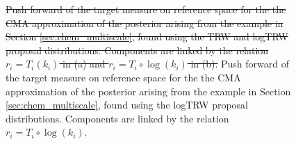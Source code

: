 \documentclass[final]{siamltex}
\newcommand{\edit}[1]{{\color{red} #1}}  %
\providecommand{\DIFdel}[1]{{\protect\color{red}\sout{#1}}}                      %
\providecommand{\DIFdelend}{} %
\providecommand{\DIFdelFL}[1]{\DIFdel{#1}} %
\providecommand{\DIFaddbeginFL}{} %
\providecommand{\DIFaddendFL}{} %
\providecommand{\DIFdelbeginFL}{} %
\providecommand{\DIFdelendFL}{} %
\newcommand{\DIFscaledelfig}{0.5}
\newlength{\DIFdelgraphicswidth} %
\newlength{\DIFdelgraphicsheight} %
\newcommand{\DIFaddincludegraphics}[2][]{{\color{blue}\fbox{\DIFOincludegraphics[#1]{#2}}}} %
\newcommand{\DIFdelincludegraphics}[2][]{%
\sbox{\DIFdelgraphicsbox}{\DIFOincludegraphics[#1]{#2}}%
\settoboxwidth{\DIFdelgraphicswidth}{\DIFdelgraphicsbox} %
\settoboxtotalheight{\DIFdelgraphicsheight}{\DIFdelgraphicsbox} %
\scalebox{\DIFscaledelfig}{%
\parbox[b]{\DIFdelgraphicswidth}{\usebox{\DIFdelgraphicsbox}\\[-\baselineskip] \rule{\DIFdelgraphicswidth}{0em}}\llap{\resizebox{\DIFdelgraphicswidth}{\DIFdelgraphicsheight}{%
\setlength{\unitlength}{\DIFdelgraphicswidth}%
\begin{picture}(1,1)%
\thicklines\linethickness{2pt} %
{\color[rgb]{1,0,0}\put(0,0){\framebox(1,1){}}}%
{\color[rgb]{1,0,0}\put(0,0){\line( 1,1){1}}}%
{\color[rgb]{1,0,0}\put(0,1){\line(1,-1){1}}}%
\end{picture}%
}\hspace*{3pt}}} %
} %
\DeclareRobustCommand{\DIFdelend}{\DIFOaddend \let\includegraphics\DIFOincludegraphics} %
\DeclareRobustCommand{\DIFaddbeginFL}{\DIFOaddbeginFL \let\includegraphics\DIFaddincludegraphics} %
\DeclareRobustCommand{\DIFaddendFL}{\DIFOaddendFL \let\includegraphics\DIFOincludegraphics} %
\DeclareRobustCommand{\DIFdelbeginFL}{\DIFOdelbeginFL \let\includegraphics\DIFdelincludegraphics} %
\DeclareRobustCommand{\DIFdelendFL}{\DIFOaddendFL \let\includegraphics\DIFOincludegraphics} %
\begin{document}
\DIFdelend \begin{figure}[!htb]
\centering
\DIFdelbeginFL %
\DIFdelendFL %
\caption{\DIFdelbeginFL \DIFdelFL{Push forward of the target measure on reference space for the the CMA
  approximation of the  posterior arising from the example in Section \ref{sec:chem_multiscale}, found using the TRW and logTRW proposal distributions. Components are linked by the relation $r_i = T_i(k_i)$ in (a) and $r_i = T_i\circ\log(k_i)$ in (b).}\DIFdelendFL \DIFaddbeginFL \edit{Push forward of the target measure on reference space for the the CMA
  approximation of the  posterior arising from the example in Section \ref{sec:chem_multiscale}, found using the logTRW proposal distributions. Components are linked by the relation $r_i = T_i\circ\log(k_i)$.}\DIFaddendFL }
\label{fig:chem_reference_spaces}
\end{figure}
\end{document}

